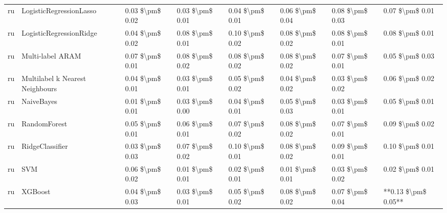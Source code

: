 \begin{tabular}{llllllll}
      ru &         LogisticRegressionLasso & 0.03 \$\textbackslash pm\$ 0.02 &           0.03 \$\textbackslash pm\$ 0.01 &       0.04 \$\textbackslash pm\$ 0.01 &        0.06 \$\textbackslash pm\$ 0.04 &                         0.08 \$\textbackslash pm\$ 0.03 &     0.07 \$\textbackslash pm\$ 0.01 \\
      ru &         LogisticRegressionRidge & 0.04 \$\textbackslash pm\$ 0.02 &           0.08 \$\textbackslash pm\$ 0.01 &       0.10 \$\textbackslash pm\$ 0.02 &        0.08 \$\textbackslash pm\$ 0.02 &                         0.08 \$\textbackslash pm\$ 0.01 &     0.08 \$\textbackslash pm\$ 0.01 \\
      ru &                Multi-label ARAM & 0.07 \$\textbackslash pm\$ 0.01 &           0.08 \$\textbackslash pm\$ 0.02 &       0.08 \$\textbackslash pm\$ 0.02 &        0.08 \$\textbackslash pm\$ 0.02 &                         0.07 \$\textbackslash pm\$ 0.01 &     0.05 \$\textbackslash pm\$ 0.03 \\
      ru & Multilabel k Nearest Neighbours & 0.04 \$\textbackslash pm\$ 0.01 &           0.03 \$\textbackslash pm\$ 0.01 &       0.05 \$\textbackslash pm\$ 0.02 &        0.04 \$\textbackslash pm\$ 0.02 &                         0.03 \$\textbackslash pm\$ 0.02 &     0.06 \$\textbackslash pm\$ 0.02 \\
      ru &                      NaiveBayes & 0.01 \$\textbackslash pm\$ 0.01 &           0.03 \$\textbackslash pm\$ 0.00 &       0.04 \$\textbackslash pm\$ 0.01 &        0.05 \$\textbackslash pm\$ 0.03 &                         0.03 \$\textbackslash pm\$ 0.01 &     0.05 \$\textbackslash pm\$ 0.01 \\
      ru &                    RandomForest & 0.05 \$\textbackslash pm\$ 0.01 &           0.06 \$\textbackslash pm\$ 0.01 &       0.07 \$\textbackslash pm\$ 0.02 &        0.08 \$\textbackslash pm\$ 0.02 &                         0.07 \$\textbackslash pm\$ 0.01 &     0.09 \$\textbackslash pm\$ 0.02 \\
      ru &                 RidgeClassifier & 0.03 \$\textbackslash pm\$ 0.03 &           0.07 \$\textbackslash pm\$ 0.02 &       0.10 \$\textbackslash pm\$ 0.01 &        0.08 \$\textbackslash pm\$ 0.02 &                         0.09 \$\textbackslash pm\$ 0.01 &     0.10 \$\textbackslash pm\$ 0.01 \\
      ru &                             SVM & 0.06 \$\textbackslash pm\$ 0.02 &           0.01 \$\textbackslash pm\$ 0.01 &       0.02 \$\textbackslash pm\$ 0.01 &        0.01 \$\textbackslash pm\$ 0.01 &                         0.03 \$\textbackslash pm\$ 0.02 &     0.02 \$\textbackslash pm\$ 0.01 \\
      ru &                         XGBoost & 0.04 \$\textbackslash pm\$ 0.03 &           0.03 \$\textbackslash pm\$ 0.01 &       0.05 \$\textbackslash pm\$ 0.02 &        0.08 \$\textbackslash pm\$ 0.02 &                         0.07 \$\textbackslash pm\$ 0.04 & **0.13 \$\textbackslash pm\$ 0.05** \\
\bottomrule
\end{tabular}
